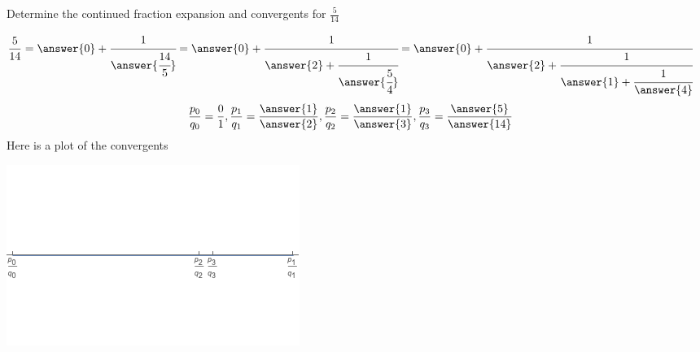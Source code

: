 \documentclass{ximera}
\begin{document}
\begin{example}
 Determine the continued fraction expansion and convergents for $\frac{5}{14}$
 
\begin{align*}
 \frac{5}{14}&=\answer{0}+\cfrac{1}{\answer{\cfrac{14}{5}}}
 =\answer{0}+\cfrac{1}{\answer{2}+\cfrac{1}{\answer{\cfrac{5}{4}}}}
 =\answer{0}+\cfrac{1}{\answer{2}+\cfrac{1}{\answer{1}+\cfrac{1}{\answer{4}}}}
\end{align*}
\begin{align*}
 \frac{p_0}{q_0}&=\frac{0}{1}, \frac{p_1}{q_1}=\frac{\answer{1}}{\answer{2}}, \frac{p_2}{q_2}=\frac{\answer{1}}{\answer{3}},\frac{p_3}{q_3}=\frac{\answer{5}}{\answer{14}}
\end{align*}
Here is a plot of the convergents
\begin{image}
 \includegraphics{example1}
\end{image}
\end{example}
\end{document}
